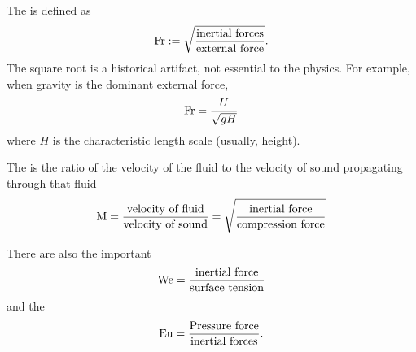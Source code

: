 \begin{example}
The  is defined as
\begin{equation}
\mathrm{Fr} := \sqrt{\frac{\mbox{inertial forces}}{\mbox{external force}}}.
\end{equation}
The square root is a historical artifact, not essential to the physics.
For example, when gravity is the dominant external force,
\begin{equation}
\mathrm{Fr} = \frac{U}{\sqrt{gH}}
\end{equation}
where $H$ is the characteristic length scale (usually, height).
\end{example}

\begin{example}
The  is the ratio of the velocity of the fluid to
the velocity of sound propagating through that fluid
\begin{equation}
\mathrm{M} = \frac{\mbox{velocity of fluid}}{\mbox{velocity of sound}}=\sqrt{\frac{\mbox{inertial force}}{\mbox{compression force}}}
\end{equation}
\end{example}

\begin{node}
There are also the important 
\begin{equation}
\mathrm{We} = \frac{\mbox{inertial force}}{\mbox{surface tension}}
\end{equation}
and the 
\begin{equation}
\mathrm{Eu} = \frac{\mbox{Pressure force}}{\mbox{inertial forces}}.
\end{equation}
\end{node}